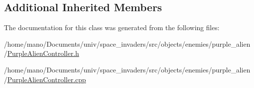 \subsection*{Additional Inherited Members}


The documentation for this class was generated from the following files\+:\begin{DoxyCompactItemize}
\item 
/home/mano/\+Documents/univ/space\+\_\+invaders/src/objects/enemies/purple\+\_\+alien/\hyperlink{PurpleAlienController_8h}{Purple\+Alien\+Controller.\+h}\item
/home/mano/\+Documents/univ/space\+\_\+invaders/src/objects/enemies/purple\+\_\+alien/\hyperlink{PurpleAlienController_8cpp}{Purple\+Alien\+Controller.\+cpp}\end{DoxyCompactItemize}
